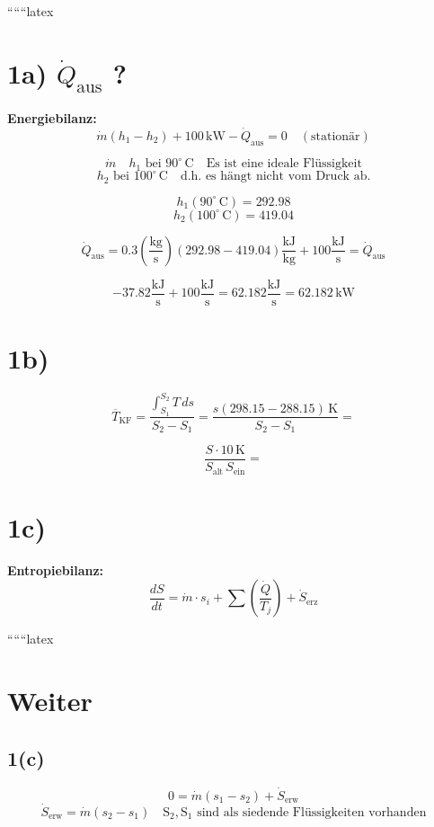 
``````latex


\section*{1a) $\dot{Q}_{\text{aus}}$ ?}

\textbf{Energiebilanz:} \\
\[
\dot{m} (h_1 - h_2) + 100 \, \text{kW} - \dot{Q}_{\text{aus}} = 0 \quad (\text{stationär})
\]

\[
\dot{m} \quad h_1 \text{ bei } 90^\circ \, \text{C} \quad \text{Es ist eine ideale Flüssigkeit}
\]
\[
h_2 \text{ bei } 100^\circ \, \text{C} \quad \text{d.h. es hängt nicht vom Druck ab.}
\]

\[
h_1 (90^\circ \, \text{C}) = 292.98
\]
\[
h_2 (100^\circ \, \text{C}) = 419.04
\]

\[
\dot{Q}_{\text{aus}} = 0.3 \left( \frac{\text{kg}}{\text{s}} \right) \left( 292.98 - 419.04 \right) \frac{\text{kJ}}{\text{kg}} + 100 \frac{\text{kJ}}{\text{s}} = \dot{Q}_{\text{aus}}
\]

\[
-37.82 \frac{\text{kJ}}{\text{s}} + 100 \frac{\text{kJ}}{\text{s}} = 62.182 \frac{\text{kJ}}{\text{s}} = 62.182 \, \text{kW}
\]

\section*{1b)}

\[
\overline{T}_{\text{KF}} = \frac{\int_{S_1}^{S_2} T \, ds}{S_2 - S_1} = \frac{s \left( 298.15 - 288.15 \right) \, \text{K}}{S_2 - S_1} = 
\]

\[
\frac{S \cdot 10 \, \text{K}}{S_{\text{alt}} \, S_{\text{ein}}} = 
\]

\section*{1c)}

\textbf{Entropiebilanz:}
\[
\frac{dS}{dt} = \dot{m} \cdot s_i + \sum \left( \frac{\dot{Q}}{T_j} \right) + \dot{S}_{\text{erz}}
\]

 

``````latex


\section*{Weiter}

\subsection*{1(c)}
\begin{equation*}
0 = \dot{m} (s_1 - s_2) + \dot{S}_{\text{erw}}
\end{equation*}
\begin{equation*}
\dot{S}_{\text{erw}} = \dot{m} (s_2 - s_1) \quad \text{S}_2, \text{S}_1 \text{ sind als siedende Flüssigkeiten vorhanden}
\end{equation*}

